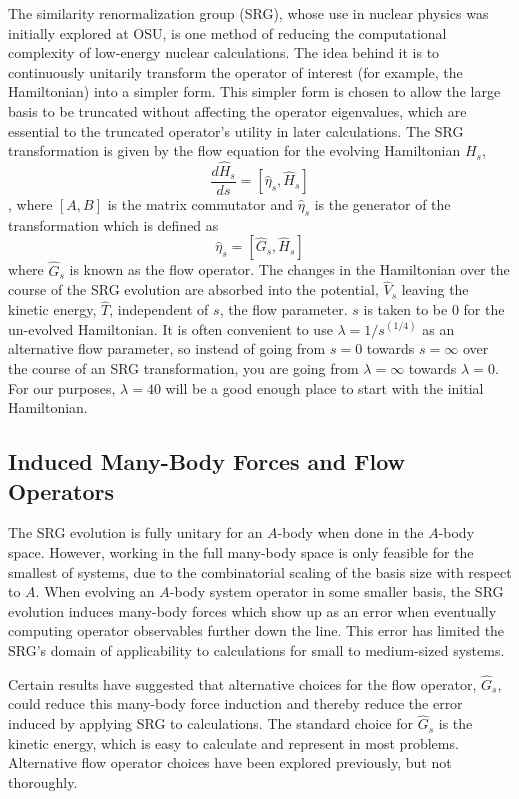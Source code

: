 The similarity renormalization group (SRG), whose use in nuclear physics was initially explored at OSU, is one method of reducing the computational complexity of low-energy nuclear calculations. The idea behind it is to continuously unitarily transform the operator of interest (for example, the Hamiltonian) into a simpler form. This simpler form is chosen to allow the large basis to be truncated without affecting the operator eigenvalues, which are essential to the truncated operator's utility in later calculations. The SRG transformation is given by the flow equation for the evolving Hamiltonian $H_s$,
\begin{equation}
\frac{d \hat{H}_s}{ds} = [\hat{\eta}_s, \hat{H}_s]
\end{equation},
where $[A, B]$ is the matrix commutator and $\hat{\eta}_s$ is the generator of the transformation which is defined as
\begin{equation}
\hat{\eta}_s = [\hat{G}_s, \hat{H}_s]
\end{equation}
where $\hat{G}_s$ is known as the flow operator. The changes in the Hamiltonian over the course of the SRG evolution are absorbed into the potential, $\hat{V}_s$ leaving the kinetic energy, $\hat{T}$, independent of $s$, the flow parameter. $s$ is taken to be 0 for the un-evolved Hamiltonian. It is often convenient to use $\lambda = 1 / s^(1/4)$ as an alternative flow parameter, so instead of going from $s=0$ towards $s=\infty$ over the course of an SRG transformation, you are going from $\lambda=\infty$ towards $\lambda=0$. For our purposes, $\lambda=40$ will be a good enough place to start with the initial Hamiltonian.

\subsection{Induced Many-Body Forces and Flow Operators}

The SRG evolution is fully unitary for an $A$-body when done in the $A$-body space. However, working in the full many-body space is only feasible for the smallest of systems, due to the combinatorial scaling of the basis size with respect to $A$. When evolving an $A$-body system operator in some smaller basis, the SRG evolution induces many-body forces which show up as an error when eventually computing operator observables further down the line. This error has limited the SRG's domain of applicability to calculations for small to medium-sized systems.

Certain results have suggested that alternative choices for the flow operator, $\hat{G}_s$, could reduce this many-body force induction and thereby reduce the error induced by applying SRG to calculations. The standard choice for $\hat{G}_s$ is the kinetic energy, which is easy to calculate and represent in most problems. Alternative flow operator choices have been explored previously, but not thoroughly.

